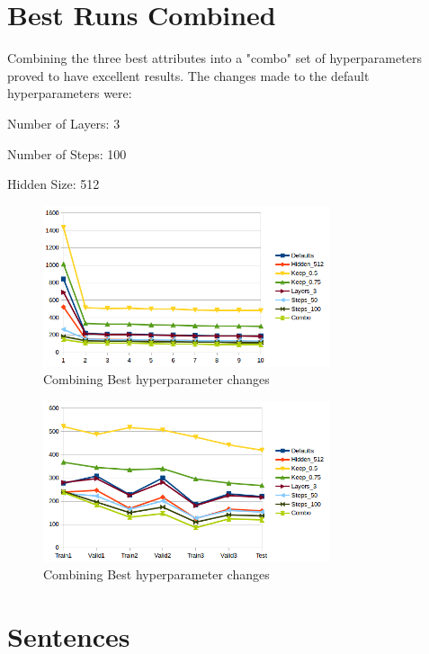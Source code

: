 \documentclass[10pt,a4paper]{article}
\begin{document}
\clearpage

\section{Best Runs Combined}

Combining the three best attributes into a "combo" set of hyperparameters proved to have excellent results. The changes made to the default hyperparameters were:


Number of Layers: 3


Number of Steps: 100


Hidden Size: 512

\begin{figure}[H]
  \begin{center}
    \includegraphics[width=0.75\textwidth] {epochs2.png}
    \caption{Combining Best hyperparameter changes}
  \end{center}
\end{figure}

\begin{figure}[H]
  \begin{center}
    \includegraphics[width=0.75\textwidth] {train-valid-test2.png}
    \caption{Combining Best hyperparameter changes}
  \end{center}
\end{figure}

\clearpage

\section{Sentences}
\end{document}
